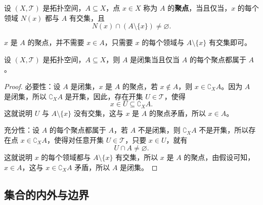 \begin{definition}
    设 $(X,\mathcal{T})$ 是拓扑空间，$A\subseteq X$，点 $x\in X$ 称为 $A$ 的\textbf{聚点}，当且仅当，$x$ 的每个领域 $N(x)$ 都与 $A$ 有交集，且
    \[
        N(x) \cap (A\setminus\{x\}) \neq \varnothing.
    \]
    \label{def:accumulation_point}
\end{definition}

\begin{example}
    
\end{example}

\begin{note}
    $x$ 是 $A$ 的聚点，并不需要 $x\in A$，只需要 $x$ 的每个领域与 $A\setminus\{x\}$ 有交集即可。
\end{note}

\begin{proposition}[闭集判定的充要条件]
    设 $(X,\mathcal{T})$ 是拓扑空间，$A\subseteq X$，则 $A$ 是闭集当且仅当 $A$ 的每个聚点都属于 $A$。
\end{proposition}
\begin{proof}
    必要性：设 $A$ 是闭集，$x$ 是 $A$ 的聚点，若 $x\notin A$，则 $x\in \complement_X A$。因为 $A$ 是闭集，所以 $\complement_X A$ 是开集，因此，存在开集 $U\in \mathcal{T}$，使得
    \[
        x\in U \subseteq \complement_X A.
    \]
    这就说明 $U$ 与 $A\setminus\{x\}$ 没有交集，这与 $x$ 是 $A$ 的聚点矛盾，所以 $x\in A$。

    充分性：设 $A$ 的每个聚点都属于 $A$，若 $A$ 不是闭集，则 $\complement_X A$ 不是开集，所以存在点 $x\in \complement_X A$，使得对任意开集 $U\in \mathcal{T}$，只要 $x\in U$，就有
    \[
        U \cap A \neq \varnothing.
    \]
    这就说明 $x$ 的每个领域都与 $A\setminus\{x\}$ 有交集，所以 $x$ 是 $A$ 的聚点，由假设可知，$x\in A$，这与 $x\in \complement_X A$ 矛盾，所以 $A$ 是闭集。
\end{proof}

\vspace{1em}

\subsection{集合的内外与边界}

\vspace{1em}


\newpage